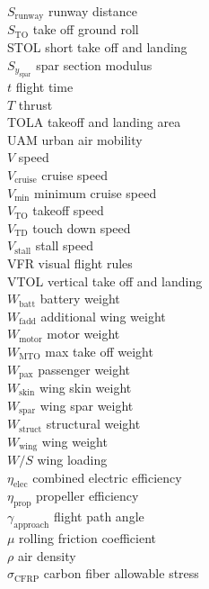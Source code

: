 \documentclass[]{aiaa-tc}%
\begin{document}
\begin{multicols}{2}
\begin{tabbing}
$S_{\mathrm{runway}}$ \> runway distance \\
$S_{\mathrm{TO}}$ \> take off ground roll \\
STOL \> short take off and landing \\
$S_{y_{\mathrm{spar}}}$ \> spar section modulus \\
$t$ \> flight time \\
$T$ \> thrust \\
TOLA \> takeoff and landing area \\
UAM \> urban air mobility \\
$V$ \> speed \\
$V_{\mathrm{cruise}}$ \> cruise speed \\
$V_{\mathrm{min}}$ \> minimum cruise speed \\
$V_{\mathrm{TO}}$ \> takeoff speed \\
$V_{\mathrm{TD}}$ \> touch down speed \\
$V_{\mathrm{stall}}$ \> stall speed \\
VFR \> visual flight rules \\
VTOL \> vertical take off and landing \\
$W_{\mathrm{batt}}$ \> battery weight \\
$W_{\mathrm{fadd}}$ \> additional wing weight\\
$W_{\mathrm{motor}}$ \> motor weight \\
$W_{\mathrm{MTO}}$ \> max take off weight \\
$W_{\mathrm{pax}}$ \> passenger weight \\
$W_{\mathrm{skin}}$ \> wing skin weight \\
$W_{\mathrm{spar}}$ \> wing spar weight \\
$W_{\mathrm{struct}}$ \> structural weight \\
$W_{\mathrm{wing}}$ \> wing weight \\
$W/S$ \> wing loading \\
$\eta_{\mathrm{elec}}$ \> combined electric efficiency \\
$\eta_{\mathrm{prop}}$ \> propeller efficiency \\
$\gamma_{\mathrm{approach}}$ \> flight path angle \\
$\mu$ \> rolling friction coefficient \\
$\rho$ \> air density \\
$\sigma_{\mathrm{CFRP}}$ \> carbon fiber allowable stress \\
 \end{tabbing}

\end{multicols}
\end{document}
